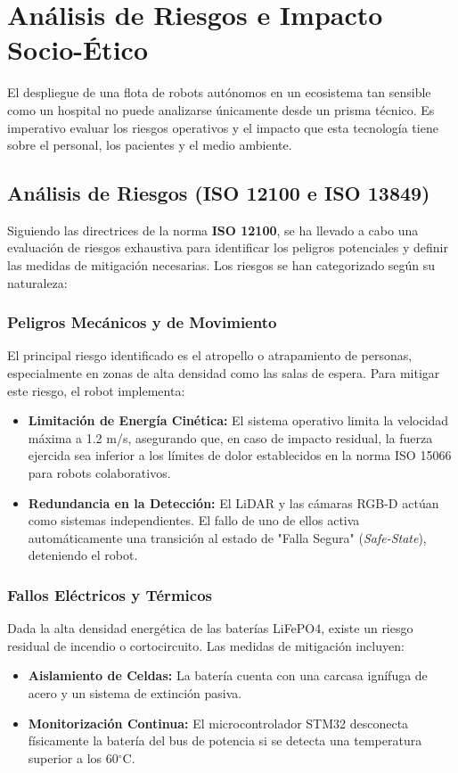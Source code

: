 \section{Análisis de Riesgos e Impacto Socio-Ético}
El despliegue de una flota de robots autónomos en un ecosistema tan sensible como un hospital no puede analizarse únicamente desde un prisma técnico. Es imperativo evaluar los riesgos operativos y el impacto que esta tecnología tiene sobre el personal, los pacientes y el medio ambiente.

\subsection{Análisis de Riesgos (ISO 12100 e ISO 13849)}
Siguiendo las directrices de la norma \textbf{ISO 12100}, se ha llevado a cabo una evaluación de riesgos exhaustiva para identificar los peligros potenciales y definir las medidas de mitigación necesarias. Los riesgos se han categorizado según su naturaleza:

\subsubsection{Peligros Mecánicos y de Movimiento}
El principal riesgo identificado es el atropello o atrapamiento de personas, especialmente en zonas de alta densidad como las salas de espera. Para mitigar este riesgo, el robot implementa:
\begin{itemize}
    \item \textbf{Limitación de Energía Cinética:} El sistema operativo limita la velocidad máxima a 1.2 m/s, asegurando que, en caso de impacto residual, la fuerza ejercida sea inferior a los límites de dolor establecidos en la norma ISO 15066 para robots colaborativos.
    \item \textbf{Redundancia en la Detección:} El LiDAR y las cámaras RGB-D actúan como sistemas independientes. El fallo de uno de ellos activa automáticamente una transición al estado de "Falla Segura" (\textit{Safe-State}), deteniendo el robot.
\end{itemize}

\subsubsection{Fallos Eléctricos y Térmicos}
Dada la alta densidad energética de las baterías LiFePO4, existe un riesgo residual de incendio o cortocircuito. Las medidas de mitigación incluyen:
\begin{itemize}
    \item \textbf{Aislamiento de Celdas:} La batería cuenta con una carcasa ignífuga de acero y un sistema de extinción pasiva.
    \item \textbf{Monitorización Continua:} El microcontrolador STM32 desconecta físicamente la batería del bus de potencia si se detecta una temperatura superior a los 60$^{\circ}$C.
\end{itemize}

